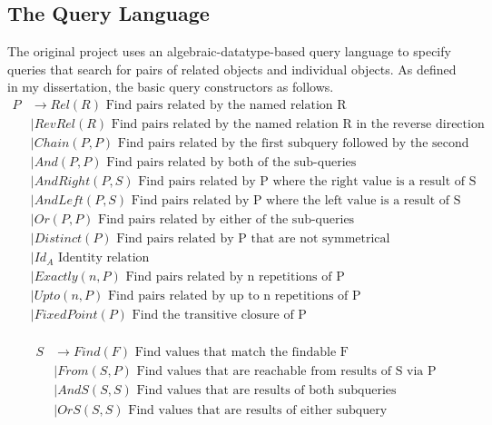 \documentclass{report}
\newcommand \2[0]{\textbf{2}}
\newcommand \3[0]{\textbf{3}}
\begin{document}
\subsection{The Query Language}
The original project uses an algebraic-datatype-based query language to specify queries that search for pairs of related objects and individual objects. As defined in my dissertation, the basic query constructors as follows.
\begin{equation}
    \label{PDefinition}
    \begin{split}
    P  &\rightarrow Rel(R) \mbox{ Find pairs related by the named relation R}\\
    &\mid RevRel(R) \mbox{ Find pairs related by the named relation R in the reverse direction}\\
    &\mid Chain(P, P) \mbox{   Find pairs related by the first subquery followed by the second}\\
    &\mid And(P, P) \mbox{  Find pairs related by both of the sub-queries}\\
    &\mid AndRight(P, S) \mbox{  Find pairs related by P where the right value is a result of S}\\
    &\mid AndLeft(P, S) \mbox{  Find pairs related by P where the left value is a result of S}\\
    &\mid Or(P, P) \mbox{  Find pairs related by either of the sub-queries}\\
    &\mid Distinct(P) \mbox{  Find pairs related by P that are not symmetrical}\\
    &\mid Id_A \mbox{ Identity relation}\\
    &\mid Exactly(\mathit{n}, P) \mbox{  Find pairs related by n repetitions of P}\\
    &\mid Upto(\mathit{n}, P) \mbox{  Find pairs related by up to n repetitions of P}\\
    &\mid FixedPoint(P) \mbox{  Find the transitive closure of P}\\
    \end{split}
    \end{equation} 

    \begin{equation}
        \label{SDefinition}
        \begin{split}
        S & \rightarrow Find(F) \mbox{ Find values that match the findable F}\\
        &\mid From(S, P) \mbox{ Find values that are reachable from results of S via P}\\
        &\mid AndS(S, S) \mbox{ Find values that are results of both subqueries}\\
        &\mid OrS(S, S) \mbox{ Find values that are results of either subquery}
        \end{split}
    \end{equation} 
\end{document}
